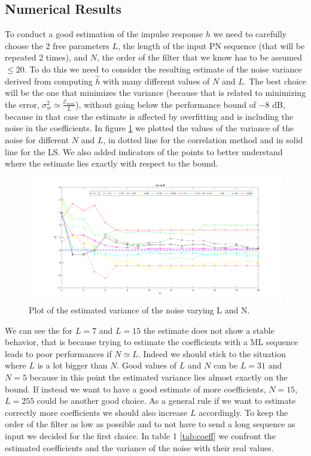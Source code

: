 \documentclass[a4paper,11.5pt]{article}
\begin{document}
\subsection*{Numerical Results}

To conduct a good estimation of the impulse response $h$ we need to carefully choose the 2 free parameters $L$, the length of the input PN sequence (that will be repeated 2 times), and $N$, the order of the filter that we know has to be assumed $\le20$. To do this we need to consider the resulting estimate of the noise variance derived from computing $\hat{h}$ with many different values of $N$ and $L$. The best choice will be the one that minimizes the variance (because that is related to minimizing the error, $\sigma_w^2\simeq \frac{\mathcal{E}_{min}}{L}$), without going below the performance bound of $-8$ dB, because in that case the estimate is affected by overfitting and is including the noise in the coefficients. In figure \ref{fig:L-N} we plotted the values of the variance of the noise for different $N$ and $L$, in dotted line for the correlation method and in solid line for the LS. We also added indicators of the points to better understand where the estimate lies exactly with respect to the bound.
 \begin{figure}[ht]
	\begin{center}    
		\includegraphics[width=\textwidth]{figs/L-N-choice.png}
		\caption{Plot of the estimated variance of the noise varying L and N.}
		\label{fig:L-N}
	\end{center}
\end{figure} 
\noindent We can see the for $L=7$ and $L=15$ the estimate does not show a stable behavior, that is because trying to estimate the coefficients with a ML sequence leads to poor performances if $N\simeq L$. Indeed we should stick to the situation where $L$ is a lot bigger than $N$. Good values of $L$ and $N$ can be $L=31$ and $N=5$ because in this point the estimated variance lies almost exactly on the bound. If instead we want to have a good estimate of more coefficients, $N=15$, $L=255$ could be another good choice. As a general rule if we want to estimate correctly more coefficients we should also increase $L$ accordingly. To keep the order of the filter as low as possible and to not have to send a long sequence as input we decided for the first choice. In table 1 \ref{tab:coeff} we confront the estimated coefficients and the variance of the noise with their real values.
\end{document}
